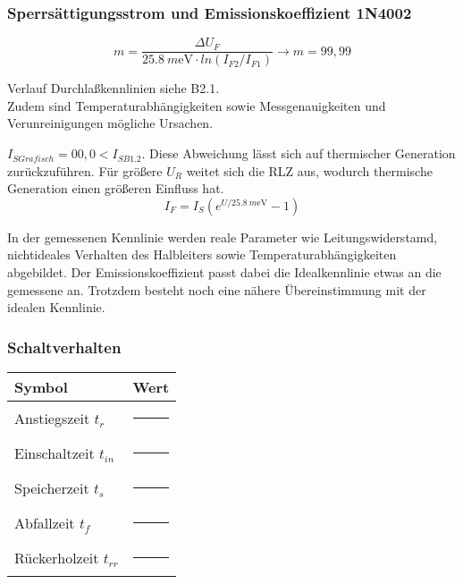 \documentclass[
	a4paper, %
	12pt, %
]{CSUniSchoolLabReport}
\newcommand{\milli}{m}
\begin{document}
\subsubsection{Sperrsättigungsstrom und Emissionskoeffizient 1N4002}
\vspace{1em} 
\[
m = \frac{\Delta U_F}{\SI{25.8}{\milli\electronvolt}\cdot ln(I_{F2}/I_{F1})} \rightarrow m = 99,99
\]
\vspace{1em}

Verlauf Durchlaßkennlinien siehe B2.1.\\

Zudem sind Temperaturabhängigkeiten sowie Messgenauigkeiten und Verunreinigungen mögliche Ursachen. 

$I_{S Grafisch} = 00,0 < I_{S B1.2}$. Diese Abweichung lässt sich auf thermischer Generation zurückzuführen. Für größere $U_R$ weitet sich die RLZ aus, wodurch thermische Generation einen größeren Einfluss hat. 
\[
I_F = I_S(e^{U/\SI{25.8}{\milli\electronvolt}}-1)
\]

In der gemessenen Kennlinie werden reale Parameter wie Leitungswiderstamd, nichtideales Verhalten des Halbleiters sowie Temperaturabhängigkeiten abgebildet.
Der Emissionskoeffizient passt dabei die Idealkennlinie etwas an die gemessene an. Trotzdem besteht noch eine nähere Übereinstimmung mit der idealen Kennlinie.

\subsubsection{Schaltverhalten}

\vspace{1em} 

\begin{center}
\begin{tabular}{ll}
\toprule
\textbf{Symbol} & \textbf{Wert} \\
\midrule
Anstiegszeit $t_r$       & \rule{3cm}{0.4pt} \\
Einschaltzeit $t_{in}$   & \rule{3cm}{0.4pt} \\
Speicherzeit  $t_s$      & \rule{3cm}{0.4pt} \\
Abfallzeit $t_f$         & \rule{3cm}{0.4pt} \\
Rückerholzeit $t_{rr}$   & \rule{3cm}{0.4pt} \\
\bottomrule
\end{tabular}
\end{center}

\vspace{1em} 
\end{document}
